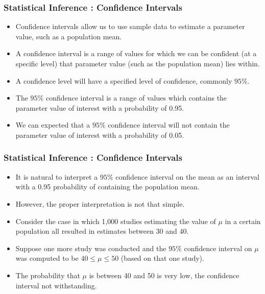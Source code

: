 \begin{frame}
\frametitle{Statistical Inference : Confidence Intervals}
\begin{itemize}
\item Confidence intervals allow us to use sample data to estimate a parameter value, such as a population mean.
\item A confidence interval is a range of values for which we can be confident (at a specific level) that parameter value (such as the population mean)  lies within.
\item A confidence level will have a specified level of confidence, commonly $95\%$.
\item The $95\%$ confidence interval is a range of values which contains the parameter value of interest with a probability of 0.95.
\item We can expected that a $95\%$ confidence interval will not contain the parameter value of interest with a probability of 0.05.
\end{itemize}
\end{frame}


\begin{frame}
\frametitle{Statistical Inference : Confidence Intervals}
\begin{itemize}

\item It is natural to interpret a $95\%$ confidence interval on the mean as an interval with a 0.95 probability of containing the population mean.
\item However, the proper interpretation is not that simple.
\item Consider the case in which 1,000 studies estimating the value of $\mu$  in a certain population all resulted
in estimates between 30 and 40.
\item Suppose one more study was conducted and the $95\%$ confidence interval on $\mu$ was computed
to be $40 \leq \mu \leq 50$ (based on that one study).

\item The probability that $\mu$ is between 40 and 50 is very low, the confidence interval not withstanding.

\end{itemize}
\end{frame}

